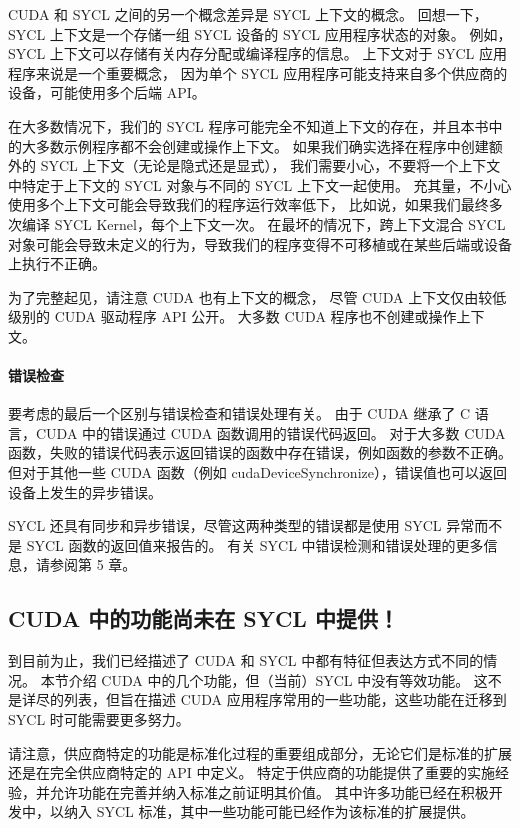 CUDA 和 SYCL 之间的另一个概念差异是 SYCL 上下文的概念。 
回想一下，SYCL 上下文是一个存储一组 SYCL 设备的 SYCL 应用程序状态的对象。 
例如，SYCL 上下文可以存储有关内存分配或编译程序的信息。 上下文对于 SYCL 应用程序来说是一个重要概念，
因为单个 SYCL 应用程序可能支持来自多个供应商的设备，可能使用多个后端 API。

在大多数情况下，我们的 SYCL 程序可能完全不知道上下文的存在，并且本书中的大多数示例程序都不会创建或操作上下文。 
如果我们确实选择在程序中创建额外的 SYCL 上下文（无论是隐式还是显式），
我们需要小心，不要将一个上下文中特定于上下文的 SYCL 对象与不同的 SYCL 上下文一起使用。 
充其量，不小心使用多个上下文可能会导致我们的程序运行效率低下，
比如说，如果我们最终多次编译 SYCL Kernel，每个上下文一次。 
在最坏的情况下，跨上下文混合 SYCL 对象可能会导致未定义的行为，导致我们的程序变得不可移植或在某些后端或设备上执行不正确。

为了完整起见，请注意 CUDA 也有上下文的概念，
尽管 CUDA 上下文仅由较低级别的 CUDA 驱动程序 API 公开。 大多数 CUDA 程序也不创建或操作上下文。

\paragraph{错误检查}

要考虑的最后一个区别与错误检查和错误处理有关。 
由于 CUDA 继承了 C 语言，CUDA 中的错误通过 CUDA 函数调用的错误代码返回。 
对于大多数 CUDA 函数，失败的错误代码表示返回错误的函数中存在错误，例如函数的参数不正确。 
但对于其他一些 CUDA 函数（例如 cudaDeviceSynchronize），错误值也可以返回设备上发生的异步错误。

SYCL 还具有同步和异步错误，尽管这两种类型的错误都是使用 SYCL 异常而不是 SYCL 函数的返回值来报告的。 
有关 SYCL 中错误检测和错误处理的更多信息，请参阅第 5 章。

\subsection{CUDA 中的功能尚未在 SYCL 中提供！}
到目前为止，我们已经描述了 CUDA 和 SYCL 中都有特征但表达方式不同的情况。 
本节介绍 CUDA 中的几个功能，但（当前）SYCL 中没有等效功能。 
这不是详尽的列表，但旨在描述 CUDA 应用程序常用的一些功能，这些功能在迁移到 SYCL 时可能需要更多努力。

请注意，供应商特定的功能是标准化过程的重要组成部分，无论它们是标准的扩展还是在完全供应商特定的 API 中定义。 
特定于供应商的功能提供了重要的实施经验，并允许功能在完善并纳入标准之前证明其价值。 
其中许多功能已经在积极开发中，以纳入 SYCL 标准，其中一些功能可能已经作为该标准的扩展提供。

